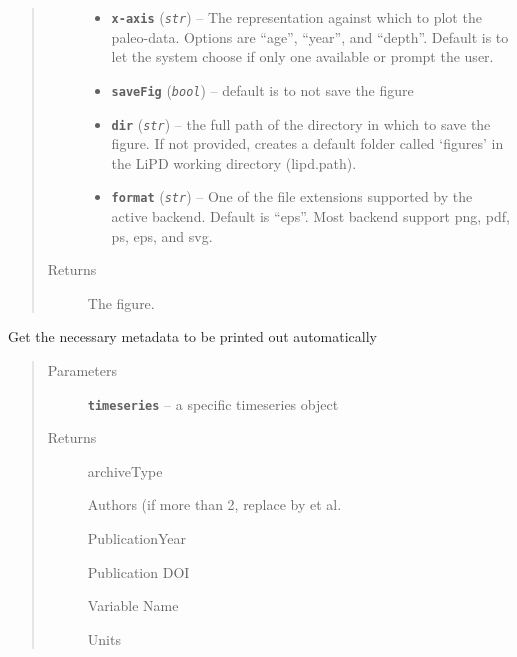 \documentclass[letterpaper,10pt,english]{sphinxmanual}
\begin{document}
\begin{fulllineitems}
\begin{fulllineitems}
\begin{quote}
\begin{description}
\begin{itemize}
\item {} 
\textbf{\texttt{x-axis}} (\emph{\texttt{str}}) -- The representation against which to plot the paleo-data.
Options are ``age'', ``year'', and ``depth''. Default is to let the
system choose if only one available or prompt the user.

\item {} 
\textbf{\texttt{saveFig}} (\emph{\texttt{bool}}) -- default is to not save the figure

\item {} 
\textbf{\texttt{dir}} (\emph{\texttt{str}}) -- the full path of the directory in which to save the figure.
If not provided, creates a default folder called `figures' in the
LiPD working directory (lipd.path).

\item {} 
\textbf{\texttt{format}} (\emph{\texttt{str}}) -- One of the file extensions supported by the active
backend. Default is ``eps''. Most backend support png, pdf, ps, eps,
and svg.

\end{itemize}

\item[{Returns}] \leavevmode
The figure.

\end{description}\end{quote}

\end{fulllineitems}


\begin{fulllineitems}
\label{SummaryPlots:pyleoclim.SummaryPlots.getMetadata}
Get the necessary metadata to be printed out automatically
\begin{quote}\begin{description}
\item[{Parameters}] \leavevmode
\textbf{\texttt{timeseries}} -- a specific timeseries object

\item[{Returns}] \leavevmode

archiveType

Authors (if more than 2, replace by et al.

PublicationYear

Publication DOI

Variable Name

Units


\end{description}
\end{quote}
\end{fulllineitems}
\end{fulllineitems}
\end{document}
